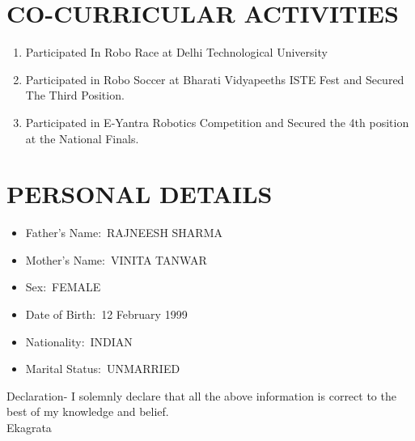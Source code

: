 \documentclass{article}
\begin{document}
\section{CO-CURRICULAR ACTIVITIES}
\begin{enumerate}
\item Participated In Robo Race at Delhi Technological University
\item Participated in Robo Soccer at Bharati Vidyapeeths ISTE Fest and Secured The Third Position.
\item Participated in E-Yantra Robotics Competition and Secured the 4th position at the National Finals.
\end{enumerate}
\section{PERSONAL DETAILS}
\begin{itemize}
\item Father's Name:\, RAJNEESH SHARMA

\item Mother's Name:\, VINITA TANWAR

\item Sex:\, FEMALE

\item Date of Birth:\, 12 February 1999

\item Nationality:\, INDIAN

\item Marital Status:\, UNMARRIED
\end{itemize}
\Large Declaration-
I solemnly declare that all the above information is correct to the best of my knowledge and belief.\\
\LARGE Ekagrata\\
\date{\today}
\end{document}
